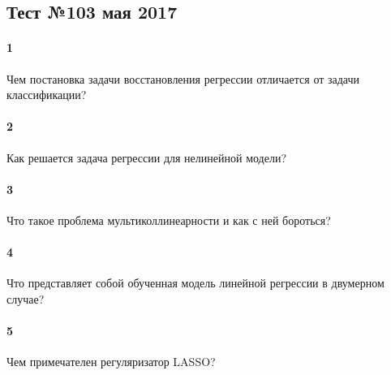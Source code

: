 \documentclass[a4paper,12pt]{article}
\begin{document}
  \subsection*{Тест №10\hfill{3 мая 2017}}

  
  \paragraph{1} Чем постановка задачи восстановления регрессии отличается от задачи классификации?

  \makebox[\linewidth]{\hrulefill}
  \makebox[\linewidth]{\hrulefill}

  \paragraph{2} Как решается задача регрессии для нелинейной модели?
	
  \makebox[\linewidth]{\hrulefill}
  \makebox[\linewidth]{\hrulefill}
  \makebox[\linewidth]{\hrulefill}
	
  \paragraph{3} Что такое проблема мультиколлинеарности и как с ней бороться?

  \makebox[\linewidth]{\hrulefill}
  \makebox[\linewidth]{\hrulefill}

  \paragraph{4} Что представляет собой обученная модель линейной регрессии в двумерном случае?

  \makebox[\linewidth]{\hrulefill}
  \makebox[\linewidth]{\hrulefill}
  \makebox[\linewidth]{\hrulefill}
  \makebox[\linewidth]{\hrulefill}

  \paragraph{5} Чем примечателен регуляризатор LASSO?

  \makebox[\linewidth]{\hrulefill}
  \makebox[\linewidth]{\hrulefill}
  \makebox[\linewidth]{\hrulefill}
  \makebox[\linewidth]{\hrulefill}
  \makebox[\linewidth]{\hrulefill}
 
\end{document}
